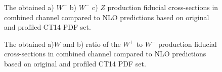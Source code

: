 \begin{figure}[!tbp]
\begin{minipage}[h]{0.32\linewidth}
\end{minipage}
\hfill
\begin{minipage}[h]{0.32\linewidth}
\end{minipage}
\hfill
\begin{minipage}[h]{0.32\linewidth}
\end{minipage}
\caption{The obtained a) $W^{+}$  b) $W^-$  c) $Z$ production fiducial cross-sections in combined channel compared to NLO predictions based on original and profiled CT14 PDF set.}
\label{fig:PDFEffectXsec}
\end{figure}



\begin{figure}[!tbp]
\begin{minipage}[h]{0.49\linewidth}
\end{minipage}
\begin{minipage}[h]{0.49\linewidth}
\end{minipage}
\caption{The obtained a)$W$  and  b) ratio of the  $W^+$ to $W^-$ production fiducial cross-sections in combined channel compared to NLO predictions based on original and profiled CT14 PDF set. }
\label{fig:PDFEffectRatio}
\end{figure}

